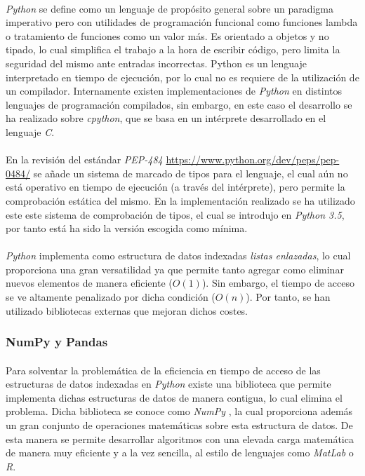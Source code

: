 \documentclass{subfiles}
\begin{document}
          \paragraph{}
          \emph{Python} se define como un lenguaje de propósito general sobre un paradigma imperativo pero con utilidades de programación funcional como funciones lambda o tratamiento de funciones como un valor más. Es orientado a objetos y no tipado, lo cual simplifica el trabajo a la hora de escribir código, pero limita la seguridad del mismo ante entradas incorrectas. Python es un lenguaje interpretado en tiempo de ejecución, por lo cual no es requiere de la utilización de un compilador. Internamente existen implementaciones de \emph{Python} en distintos lenguajes de programación compilados, sin embargo, en este caso el desarrollo se ha realizado sobre \emph{cpython}, que se basa en un intérprete desarrollado en el lenguaje \emph{C}.

          \paragraph{}
          En la revisión del estándar \emph{PEP-484} \url{https://www.python.org/dev/peps/pep-0484/} se añade un sistema de marcado de tipos para el lenguaje, el cual aún no está operativo en tiempo de ejecución (a través del intérprete), pero permite la comprobación estática del mismo. En la implementación realizado se ha utilizado este este sistema de comprobación de tipos, el cual se introdujo en \emph{Python 3.5}, por tanto está ha sido la versión escogida como mínima.

          \paragraph{}
          \emph{Python} implementa como estructura de datos indexadas \emph{listas enlazadas}, lo cual proporciona una gran versatilidad ya que permite tanto agregar como eliminar nuevos elementos de manera eficiente ($O(1)$). Sin embargo, el tiempo de acceso se ve altamente penalizado por dicha condición ($O(n)$). Por tanto, se han utilizado bibliotecas externas que mejoran dichos costes.

        \subsubsection{NumPy y Pandas}
        \label{sec:numpy_pandas}

          \paragraph{}
          Para solventar la problemática de la eficiencia en tiempo de acceso de las estructuras de datos indexadas en \emph{Python} existe una biblioteca que permite implementa dichas estructuras de datos de manera contigua, lo cual elimina el problema. Dicha biblioteca se conoce como \emph{NumPy} \cite{walt2011numpy}, la cual proporciona además un gran conjunto de operaciones matemáticas sobre esta estructura de datos. De esta manera se permite desarrollar algoritmos con una elevada carga matemática de manera muy eficiente y a la vez sencilla, al estilo de lenguajes como \emph{MatLab} o \emph{R}.
\end{document}
